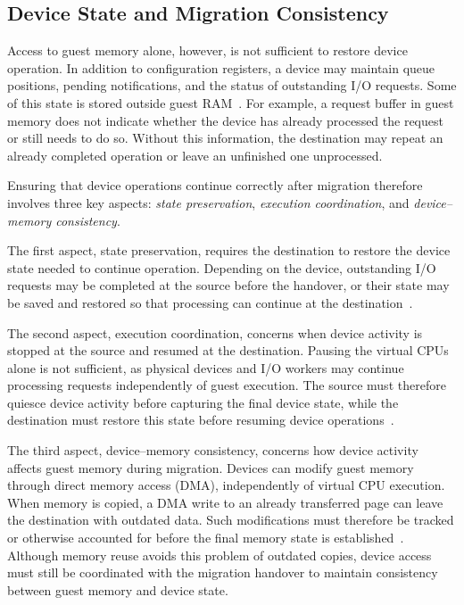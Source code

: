 \subsection{Device State and Migration Consistency}
\label{sec:state:device-migration}

Access to guest memory alone, however, is not sufficient to restore device 
operation. In addition to configuration registers, a device may maintain 
queue positions, pending notifications, and the status of outstanding I/O 
requests. Some of this state is stored outside guest RAM~\cite{qemu-migration-framework,
qemu-vhost-user}. For example, a request buffer in guest memory does not 
indicate whether the device has already processed the request or still needs 
to do so. Without this information, the destination may repeat an already 
completed operation or leave an unfinished one unprocessed.

Ensuring that device operations continue correctly after migration therefore 
involves three key aspects: \emph{state preservation}, \emph{execution 
coordination}, and \emph{device--memory consistency}.

The first aspect, state preservation, requires the destination to 
restore the device state needed to continue operation. Depending on the 
device, outstanding I/O requests may be completed at the source before the 
handover, or their state may be saved and restored so that processing can 
continue at the destination~\cite{qemu-vhost-user}.

The second aspect, execution coordination, concerns when device activity 
is stopped at the source and resumed at the destination. Pausing the virtual 
CPUs alone is not sufficient, as physical devices and I/O workers may continue 
processing requests independently of guest execution. The source must therefore 
quiesce device activity before capturing the final device state, while the 
destination must restore this state before resuming device operations~\cite{qemu-vfio-migration}.

The third aspect, device--memory consistency, concerns how device 
activity affects guest memory during migration. Devices can modify guest 
memory through direct memory access (DMA), independently of virtual CPU 
execution. When memory is copied, a DMA write to an already transferred 
page can leave the destination with outdated data. Such modifications must 
therefore be tracked or otherwise accounted for before the final memory 
state is established~\cite{qemu-vfio-migration}. Although memory reuse avoids 
this problem of outdated copies, device access must still be coordinated with 
the migration handover to maintain consistency between guest memory and device state.

